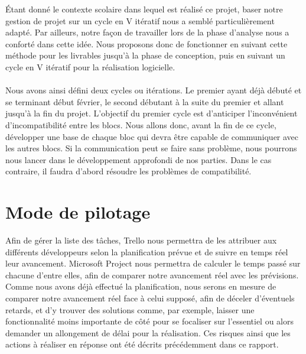 Étant donné le contexte scolaire dans lequel est réalisé ce projet, baser notre gestion de projet sur un cycle en V itératif nous a semblé particulièrement adapté. Par ailleurs, notre
façon de travailler lors de la phase d’analyse nous a conforté dans cette idée. Nous proposons donc de fonctionner en suivant cette méthode pour les livrables jusqu’à la phase de conception, puis en suivant un cycle en V itératif pour la réalisation logicielle. 

\paragraph{}

Nous avons ainsi défini deux cycles ou itérations. Le premier ayant déjà débuté et se terminant début février, le second débutant à la suite du premier et allant jusqu’à la fin du projet. L’objectif du premier cycle est d’anticiper l’inconvénient d’incompatibilité entre les blocs. Nous allons donc, avant la fin de ce cycle, développer une base de chaque bloc qui devra être capable de communiquer avec les autres blocs. Si la communication peut se faire sans problème, nous pourrons nous lancer dans le développement approfondi de nos parties. Dans le cas contraire, il faudra d’abord résoudre les problèmes de compatibilité.

\newpage

\section{Mode de pilotage}

Afin de gérer la liste des tâches, Trello nous permettra de les attribuer aux différents développeurs selon la planification prévue et de suivre en temps réel leur avancement. Microsoft Project nous permettra de calculer le temps passé sur chacune d’entre elles, afin de comparer notre avancement réel avec les prévisions. Comme nous avons déjà effectué la planification, nous serons en mesure de comparer notre avancement réel face à celui supposé, afin de déceler d’éventuels retards, et d’y trouver des solutions comme, par exemple, laisser une fonctionnalité moins importante de côté pour se focaliser sur l’essentiel ou alors demander un allongement de délai pour la réalisation. Ces risques ainsi que les actions à réaliser en réponse ont été décrits précédemment dans ce rapport.

\paragraph{}

